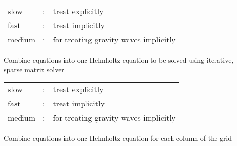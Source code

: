 \begin{slide}


\begin{tabular}{lcl}
slow &:& treat explicitly\\
fast &:& treat implicitly\\
medium &:& for treating gravity waves implicitly\\
\end{tabular}

Combine equations into one Helmholtz equation to be solved using iterative, sparse matrix solver

\end{slide}

\begin{slide}


\begin{tabular}{lcl}
slow &:& treat explicitly\\
fast &:& treat implicitly\\
medium &:& for treating gravity waves implicitly\\
\end{tabular}

Combine equations into one Helmholtz equation for each column of the grid

\end{slide}

